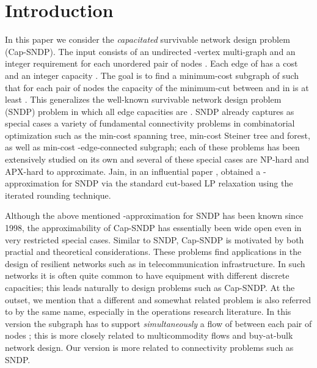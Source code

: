 \documentclass[11pt]{article}
\begin{document}
\section{Introduction}
In this paper we consider the {\em capacitated} survivable network
design problem (Cap-SNDP). The input consists of an undirected
-vertex multi-graph  and an integer requirement 
for each unordered pair of nodes . Each edge  of  has a
cost  and an integer capacity . The goal is to find a
minimum-cost subgraph  of  such that for each pair of nodes
 the capacity of the minimum-cut between  and  in  is at
least . This generalizes the well-known survivable network
design problem (SNDP) problem in which all edge capacities are
. SNDP already captures as special cases a variety of fundamental
connectivity problems in combinatorial optimization such as the
min-cost spanning tree, min-cost Steiner tree and forest, as well as
min-cost -edge-connected subgraph; each of these problems has been
extensively studied on its own and several of these special cases are
NP-hard and APX-hard to approximate. Jain, in an influential paper
\cite{Jain}, obtained a -approximation for SNDP via the standard
cut-based LP relaxation using the iterated rounding technique.

Although the above mentioned -approximation for SNDP has been known
since 1998, the approximability of Cap-SNDP has essentially been wide
open even in very restricted special cases.  Similar to SNDP, Cap-SNDP
is motivated by both practial and theoretical considerations. These
problems find applications in the design of resilient networks such as
in telecommunication infrastructure. In such networks it is often
quite common to have equipment with different discrete capacities;
this leads naturally to design problems such as Cap-SNDP.  At the
outset, we mention that a different and somewhat related problem is
also referred to by the same name, especially in the operations
research literature. In this version the subgraph  has to support
{\em simultaneously} a flow of  between each pair of nodes
; this is more closely related to multicommodity flows and
buy-at-bulk network design. Our version is more related to
connectivity problems such as SNDP.
\end{document}
